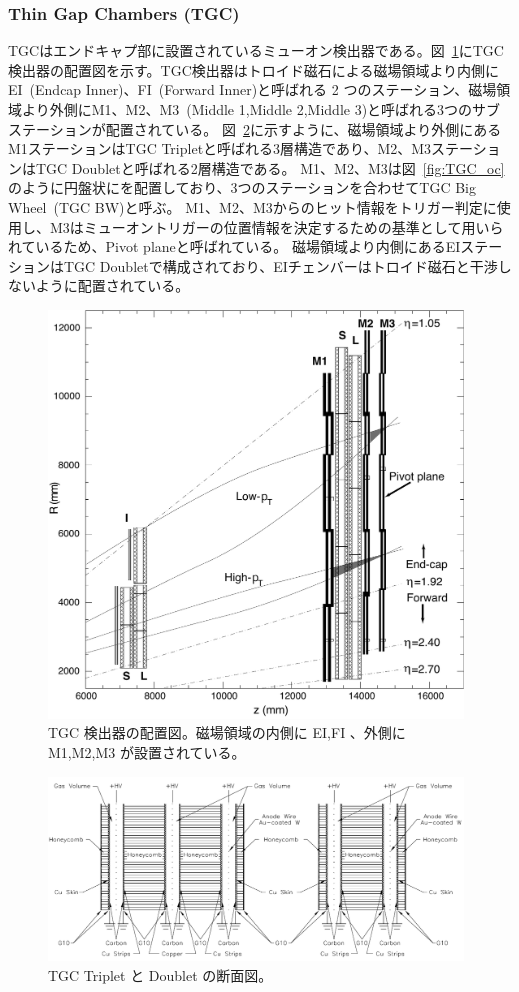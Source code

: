 \subsubsection{Thin Gap Chambers (TGC)}
TGCはエンドキャプ部に設置されているミューオン検出器である。図~\ref{fig:TGC_st}にTGC検出器の配置図を示す。TGC検出器はトロイド磁石による磁場領域より内側にEI~(Endcap Inner)、FI~(Forward Inner)と呼ばれる 2 つのステーション、磁場領域より外側にM1、M2、M3~(Middle 1,Middle 2,Middle 3)と呼ばれる3つのサブステーションが配置されている。
図~\ref{fig:TGC}に示すように、磁場領域より外側にあるM1ステーションはTGC Tripletと呼ばれる3層構造であり、M2、M3ステーションはTGC Doubletと呼ばれる2層構造である。
M1、M2、M3は図~\ref{fig:TGC_oc}のように円盤状にを配置しており、3つのステーションを合わせてTGC Big Wheel~(TGC BW)と呼ぶ。
M1、M2、M3からのヒット情報をトリガー判定に使用し、M3はミューオントリガーの位置情報を決定するための基準として用いられているため、Pivot planeと呼ばれている。
磁場領域より内側にあるEIステーションはTGC Doubletで構成されており、EIチェンバーはトロイド磁石と干渉しないように配置されている。

\begin{figure}[tb]
  \centering
  \includegraphics[clip, width=11cm]{fig/2/l1mue-schema.pdf}
  \caption{TGC 検出器の配置図\cite{Aad:1129811}。磁場領域の内側に EI,FI 、外側に M1,M2,M3 が設置されている。}
  \label{fig:TGC_st}
\end{figure}

\begin{figure}[tb]
  \centering
  \includegraphics[clip, width=11cm]{fig/2/TGC_construction.pdf}
  \caption{TGC Triplet と Doublet の断面図\cite{Aad:1129811}。}
  \label{fig:TGC}
\end{figure}

